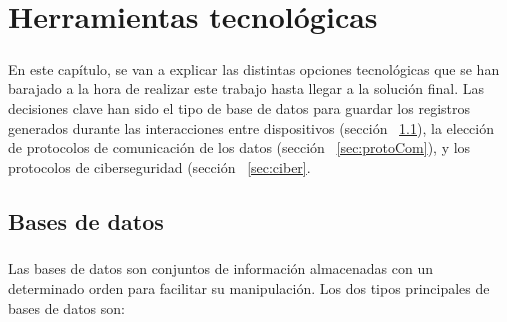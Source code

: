 %
%

\chapter{Herramientas tecnológicas}

\paragraph{}
En este capítulo, se van a explicar las distintas opciones tecnológicas que se han barajado a la hora de realizar este trabajo hasta llegar a la solución final. Las decisiones clave han sido el tipo de base de datos para guardar los registros generados durante las interacciones entre dispositivos (sección ~\ref{sec:tipoBD}), la elección de protocolos de comunicación de los datos (sección ~\ref{sec:protoCom}),  y los protocolos de ciberseguridad (sección ~\ref{sec:ciber}.


\section{Bases de datos}
\label{sec:tipoBD}
\paragraph{}
Las bases de datos son conjuntos de información almacenadas con un determinado orden para facilitar su manipulación. Los dos tipos principales de bases de datos son:

